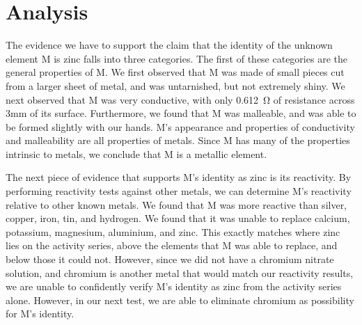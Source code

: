 \documentclass[titlepage]{article}
\begin{document}
\section{Analysis}

The evidence we have to support the claim that the identity of the unknown element M is zinc falls into three categories. The first of these categories are the general properties of M. We first observed that M was made of small pieces cut from a larger sheet of metal, and was untarnished, but not extremely shiny. We next observed that M was very conductive, with only \SI{0.612}{\ohm} of resistance across 3mm of its surface. Furthermore, we found that M was malleable, and was able to be formed slightly with our hands. M's appearance and properties of conductivity and malleability are all properties of metals. Since M has many of the properties intrinsic to metals, we conclude that M is a metallic element. 

The next piece of evidence that supports M's identity as zinc is its reactivity. By performing reactivity tests against other metals, we can determine M's reactivity relative to other known metals. We found that M was more reactive than silver, copper, iron, tin, and hydrogen. We found that it was unable to replace calcium, potassium, magnesium, aluminium, and zinc. This exactly matches where zinc lies on the activity series, above the elements that M was able to replace, and below those it could not. However, since we did not have a chromium nitrate solution, and chromium is another metal that would match our reactivity results, we are unable to confidently verify M's identity as zinc from the activity series alone. However, in our next test, we are able to eliminate chromium as possibility for M's identity.
\end{document}
